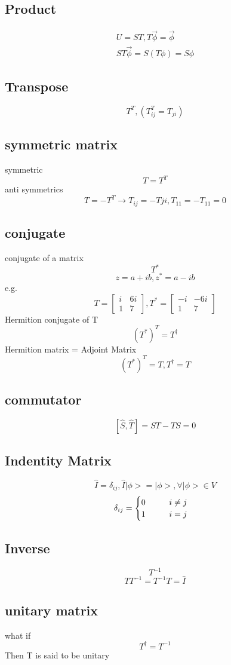 \documentclass[12pt, a4paper]{article}
\newcommand{\tab}[1][1cm]{\hspace*{#1}}
\begin{document}
\subsection{Product}
\begin{align*}
U=ST, T\vec{\phi}=\vec{\phi}\\
ST\vec{\phi}=S(T\phi)=S\phi
\end{align*}

\subsection{Transpose}
$$T^T, (T^T_{ij}=T_{ji})$$

\subsection{symmetric matrix}
symmetric
$$T=T^T$$
anti symmetrics
$$T=-T^T \rightarrow T_{ij}=-T{ji}, T_{11}=-T_{11}=0$$

\subsection{conjugate}
conjugate of a matrix
$$T^*$$
$$z=a+ib, z^*=a-ib$$
e.g.
$$
T=
\begin{bmatrix}
i & 6i\\
1 & 7
\end{bmatrix}
,T^*=
\begin{bmatrix}
-i & -6i\\
1 & 7
\end{bmatrix}
$$
Hermition conjugate of T 
$$(T^*)^T=T^{\dagger}$$
Hermition matrix = Adjoint Matrix
$$(T^*)^T=T,T^{\dagger}=T$$

\subsection{commutator}
$$[\hat{S},\hat{T}]=ST-TS=0$$

\subsection{Indentity Matrix}
$$\hat{I}=\delta_{ij},\hat{I}|\phi>=|\phi>, \forall	|\phi>\in V$$
$$
\delta_{ij}=
\begin{cases}
0\tab i \not = j\\
1\tab i = j
\end{cases}
$$

\subsection{Inverse}
$$T^{-1}$$
$$TT^{-1}=T^{-1}T=\hat{I}$$

\subsection{unitary matrix}
what if $$T^{\dagger}=T^{-1}$$
Then T is said to be unitary
\end{document}
